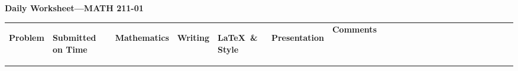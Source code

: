 \documentclass[landscape]{article}
\begin{document}
\thispagestyle{empty}

\begin{center}
    \Large\textbf{Daily Worksheet—MATH 211-01}
\end{center}

\vspace{0.25cm}

\setlength{\tabcolsep}{4pt}
\renewcommand{\arraystretch}{1.5}
\newcommand{\gray}{\cellcolor{gray!20}}

\noindent
\begin{tabular}{|
>{\centering\arraybackslash}m{1.5 cm}|
>{\centering\arraybackslash}m{0.35cm}|
>{\centering\arraybackslash}m{0.35cm}|
>{\centering\arraybackslash}m{0.35cm}|
>{\centering\arraybackslash}m{0.35cm}|
>{\centering\arraybackslash}m{0.35cm}|
>{\arraybackslash}m{9.5cm}|
>{\centering\arraybackslash}m{0.35cm}|%
>{\centering\arraybackslash}m{0.35cm}|%
>{\centering\arraybackslash}m{0.35cm}|%
>{\centering\arraybackslash}m{0.35cm}|%
>{\centering\arraybackslash}m{0.35cm}|%
>{\centering\arraybackslash}m{0.35cm}|%
>{\centering\arraybackslash}m{0.35cm}|%
>{\centering\arraybackslash}m{0.35cm}|%
>{\centering\arraybackslash}m{0.35cm}|%
>{\centering\arraybackslash}m{0.35cm}|%
>{\centering\arraybackslash}m{0.35cm}|%
>{\centering\arraybackslash}m{0.35cm}|%
>{\centering\arraybackslash}m{0.35cm}|%
>{\centering\arraybackslash}m{0.35cm}|%
>{\centering\arraybackslash}m{0.35cm}|%
>{\centering\arraybackslash}m{0.35cm}|%
}
\hline
\multicolumn{7}{|c|}{\textbf{Presenters}} & \multicolumn{16}{c|}{\textbf{Contributors}} \\
\hline
\begin{turn}{90}\textbf{Problem}\end{turn} &
\begin{turn}{90}\textbf{Submitted on Time ~}\end{turn} &
\begin{turn}{90}\textbf{Mathematics}\end{turn} &
\begin{turn}{90}\textbf{Writing}\end{turn} &
\begin{turn}{90}\textbf{\LaTeX\ \& Style}\end{turn} &
\begin{turn}{90}\textbf{Presentation}\end{turn} &
\parbox[c][1.5cm][c]{8cm}{\centering\textbf{Comments}} &

\end{tabular}
\end{document}
